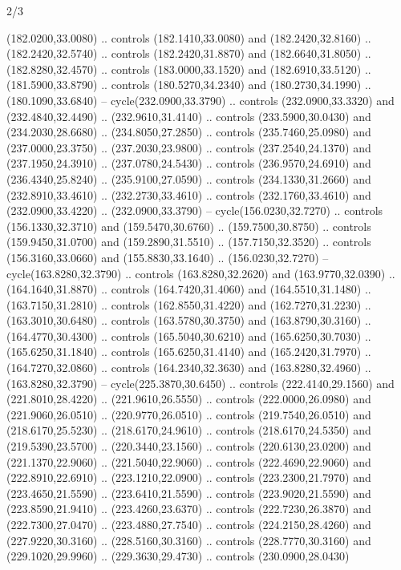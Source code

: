 \begin{flagdescription}{2/3}
\begin{scope}[xshift=0.5\flaglength,yshift=0.5\flagwidth,scale=\stretchfactor]
\begin{scope}[scale=0.001645\flagwidth,yshift=65mm,xshift=-63mm]
\begin{scope}[y=0.80pt, x=0.80pt, yscale=-1,]
\begin{scope}[cm={{1.33333,0.0,0.0,1.33333,(0.0,1e-05)}}]
  (182.0200,33.0080) .. controls (182.1410,33.0080) and (182.2420,32.8160) ..
  (182.2420,32.5740) .. controls (182.2420,31.8870) and (182.6640,31.8050) ..
  (182.8280,32.4570) .. controls (183.0000,33.1520) and (182.6910,33.5120) ..
  (181.5900,33.8790) .. controls (180.5270,34.2340) and (180.2730,34.1990) ..
  (180.1090,33.6840) -- cycle(232.0900,33.3790) .. controls (232.0900,33.3320)
  and (232.4840,32.4490) .. (232.9610,31.4140) .. controls (233.5900,30.0430)
  and (234.2030,28.6680) .. (234.8050,27.2850) .. controls (235.7460,25.0980)
  and (237.0000,23.3750) .. (237.2030,23.9800) .. controls (237.2540,24.1370)
  and (237.1950,24.3910) .. (237.0780,24.5430) .. controls (236.9570,24.6910)
  and (236.4340,25.8240) .. (235.9100,27.0590) .. controls (234.1330,31.2660)
  and (232.8910,33.4610) .. (232.2730,33.4610) .. controls (232.1760,33.4610)
  and (232.0900,33.4220) .. (232.0900,33.3790) -- cycle(156.0230,32.7270) ..
  controls (156.1330,32.3710) and (159.5470,30.6760) .. (159.7500,30.8750) ..
  controls (159.9450,31.0700) and (159.2890,31.5510) .. (157.7150,32.3520) ..
  controls (156.3160,33.0660) and (155.8830,33.1640) .. (156.0230,32.7270) --
  cycle(163.8280,32.3790) .. controls (163.8280,32.2620) and (163.9770,32.0390)
  .. (164.1640,31.8870) .. controls (164.7420,31.4060) and (164.5510,31.1480) ..
  (163.7150,31.2810) .. controls (162.8550,31.4220) and (162.7270,31.2230) ..
  (163.3010,30.6480) .. controls (163.5780,30.3750) and (163.8790,30.3160) ..
  (164.4770,30.4300) .. controls (165.5040,30.6210) and (165.6250,30.7030) ..
  (165.6250,31.1840) .. controls (165.6250,31.4140) and (165.2420,31.7970) ..
  (164.7270,32.0860) .. controls (164.2340,32.3630) and (163.8280,32.4960) ..
  (163.8280,32.3790) -- cycle(225.3870,30.6450) .. controls (222.4140,29.1560)
  and (221.8010,28.4220) .. (221.9610,26.5550) .. controls (222.0000,26.0980)
  and (221.9060,26.0510) .. (220.9770,26.0510) .. controls (219.7540,26.0510)
  and (218.6170,25.5230) .. (218.6170,24.9610) .. controls (218.6170,24.5350)
  and (219.5390,23.5700) .. (220.3440,23.1560) .. controls (220.6130,23.0200)
  and (221.1370,22.9060) .. (221.5040,22.9060) .. controls (222.4690,22.9060)
  and (222.8910,22.6910) .. (223.1210,22.0900) .. controls (223.2300,21.7970)
  and (223.4650,21.5590) .. (223.6410,21.5590) .. controls (223.9020,21.5590)
  and (223.8590,21.9410) .. (223.4260,23.6370) .. controls (222.7230,26.3870)
  and (222.7300,27.0470) .. (223.4880,27.7540) .. controls (224.2150,28.4260)
  and (227.9220,30.3160) .. (228.5160,30.3160) .. controls (228.7770,30.3160)
  and (229.1020,29.9960) .. (229.3630,29.4730) .. controls (230.0900,28.0430)

\end{scope}
\end{scope}
\end{scope}
\end{scope}
\end{flagdescription}
